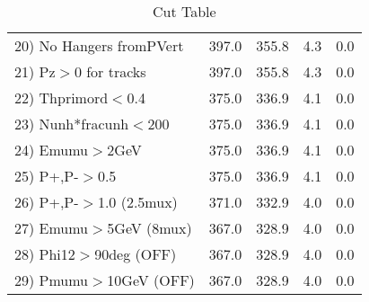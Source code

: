 \begin{table}[h!]
\begin{tabular}{||l||r|r|r|r||}
 20) No Hangers fromPVert &       397.0 &       355.8 &         4.3 &         0.0 \\
 21) Pz$>$0 for tracks    &       397.0 &       355.8 &         4.3 &         0.0 \\
 22) Thprimord$<$0.4      &       375.0 &       336.9 &         4.1 &         0.0 \\
 23) Nunh*fracunh$<$200   &       375.0 &       336.9 &         4.1 &         0.0 \\
 24) Emumu$>$2GeV         &       375.0 &       336.9 &         4.1 &         0.0 \\
 25) P+,P-$>$0.5          &       375.0 &       336.9 &         4.1 &         0.0 \\
 26) P+,P-$>$1.0 (2.5mux) &       371.0 &       332.9 &         4.0 &         0.0 \\
 27) Emumu$>$5GeV  (8mux) &       367.0 &       328.9 &         4.0 &         0.0 \\
 28) Phi12$>$90deg  (OFF) &       367.0 &       328.9 &         4.0 &         0.0 \\
 29) Pmumu$>$10GeV  (OFF) &       367.0 &       328.9 &         4.0 &         0.0 \\
 \hline
 \hline
 \end{tabular}
 \caption{Cut Table \cohpip }
 \label{tab-cut_copip}
 \end{table}
